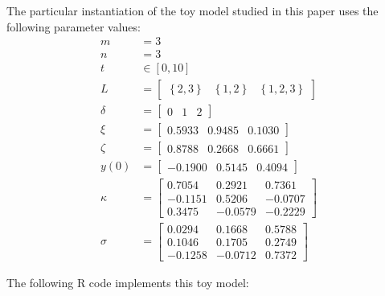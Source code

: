 \documentclass[12pt]{article}
\begin{document}
The particular instantiation of the toy model studied in this paper uses the following parameter values:
\begin{align*}
    m & = 3
    \\
    n & = 3
    \\
    t & \in [0, 10]
    \\
    L & = \begin{bmatrix} \left\{ 2, 3 \right\} & \left\{ 1, 2 \right\} & \left\{ 1, 2, 3 \right\} \end{bmatrix}
    \\
    \delta & = \begin{bmatrix} 0 & 1 & 2 \end{bmatrix}
    \\
    \xi & = \begin{bmatrix} 0.5933 & 0.9485 & 0.1030 \end{bmatrix}
    \\
    \zeta & = \begin{bmatrix} 0.8788 & 0.2668 & 0.6661 \end{bmatrix}
    \\
    y(0) & = \begin{bmatrix} -0.1900 & 0.5145 & 0.4094 \end{bmatrix}
    \\
    \kappa & = \begin{bmatrix} 0.7054 & 0.2921 & 0.7361 \\ -0.1151 & 0.5206 & -0.0707 \\ 0.3475 & -0.0579 & -0.2229 \end{bmatrix}
    \\
    \sigma & = \begin{bmatrix} 0.0294 & 0.1668 & 0.5788 \\ 0.1046 & 0.1705 & 0.2749 \\ -0.1258 & -0.0712 & 0.7372 \end{bmatrix}
\end{align*}

The following R code implements this toy model:
\end{document}
